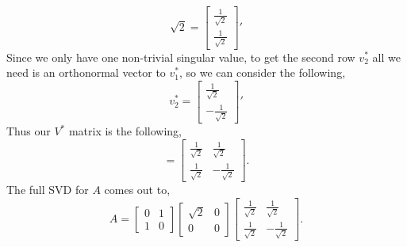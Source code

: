 \documentclass[12pt]{article}
\makeatletter
\theoremstyle{homework}
\newenvironment{exercise}[1]
{\def\@currentlabel{#1}\exercisecore}
{\endexercisecore}
\makeatother
\begin{document}
\begin{exercise}{P10}
\begin{enumerate}
\begin{equation*}
{        \sqrt{2}
      }
       = \begin{bmatrix}
        \frac{1}{\sqrt{2}} \\
        \frac{1}{\sqrt{2}}
      \end{bmatrix}'
  \end{equation*}
  Since we only have one non-trivial singular value, to get the second row $v^*_2$ all we need is 
  an orthonormal vector to $v^*_1$, so we can consider the following, 
  \begin{equation*}
    v^*_2 = \begin{bmatrix}
      \frac{1}{\sqrt{2}} \\
      -\frac{1}{\sqrt{2}}
    \end{bmatrix}'
  \end{equation*} 
Thus our $V^*$ matrix is the following,
\begin{equation*}
  = \begin{bmatrix}
    \frac{1}{\sqrt{2}} & \frac{1}{\sqrt{2}} \\
    \frac{1}{\sqrt{2}} & -\frac{1}{\sqrt{2}} 
  \end{bmatrix}.
\end{equation*}
The full SVD for $A$ comes out to, 
\begin{equation*}
  A = 
  \begin{bmatrix}
    0 & 1\\
    1 & 0
  \end{bmatrix}
  \begin{bmatrix}
    \sqrt{2} & 0\\
    0 & 0
  \end{bmatrix}
  \begin{bmatrix}
    \frac{1}{\sqrt{2}} & \frac{1}{\sqrt{2}} \\
    \frac{1}{\sqrt{2}} & -\frac{1}{\sqrt{2}} 
  \end{bmatrix}.
\end{equation*}

  \vspace{.15in}



\end{enumerate}
\end{exercise}
\end{document}
